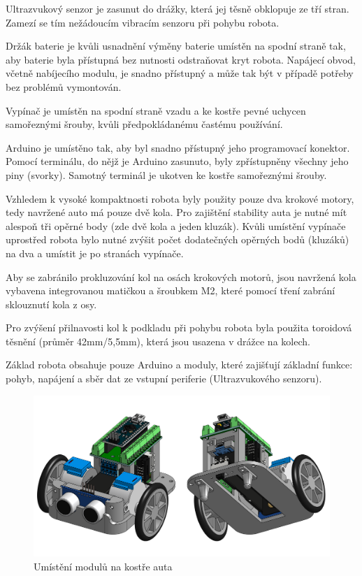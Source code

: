 \documentclass[12pt]{article}
\begin{document}
\begin{spacing}{1.5}
	Ultrazvukový senzor je zasunut do drážky, která jej těsně obklopuje ze tří stran. Zamezí se tím nežádoucím vibracím senzoru při pohybu robota.
	
	Držák baterie je kvůli usnadnění výměny baterie umístěn na spodní straně tak, aby baterie byla přístupná bez nutnosti odstraňovat kryt robota. Napájecí obvod, včetně nabíjecího modulu, je snadno přístupný a může tak být v případě potřeby bez problémů vymontován.
	
	Vypínač je umístěn na spodní straně vzadu a ke kostře pevné uchycen samořeznými šrouby, kvůli předpokládanému častému používání.
	
	Arduino je umístěno tak, aby byl snadno přístupný jeho programovací konektor. Pomocí terminálu, do nějž je Arduino zasunuto, byly zpřístupněny všechny jeho piny (svorky). Samotný terminál je ukotven ke kostře samořeznými šrouby.
	
	Vzhledem k vysoké kompaktnosti robota byly použity pouze dva krokové motory, tedy navržené auto má pouze dvě kola. Pro zajištění stability auta je nutné mít alespoň tři opěrné body (zde dvě kola a jeden kluzák). Kvůli umístění vypínače uprostřed robota bylo nutné zvýšit počet dodatečných opěrných bodů (kluzáků) na dva a umístit je po stranách vypínače.
	
	Aby se zabránilo prokluzování kol na osách krokových motorů, jsou navržená kola vybavena integrovanou matičkou a šroubkem M2, které pomocí tření zabrání sklouznutí kola z osy.
	
	Pro zvýšení přilnavosti kol k podkladu při pohybu robota byla použita toroidová těsnění (průměr 42mm/5,5mm), která jsou usazena v drážce na kolech.
	
	Základ robota obsahuje pouze Arduino a moduly, které zajišťují základní funkce: pohyb, napájení a sběr dat ze vstupní periferie (Ultrazvukového senzoru).
	
	\begin{figure}[H]
		\centering
		\includegraphics[width=\linewidth]{moduly_kostra}
		\caption{Umístění modulů na kostře auta}
		\label{fig:moduly_kostra}
	\end{figure}
	

\end{spacing}
\end{document}
